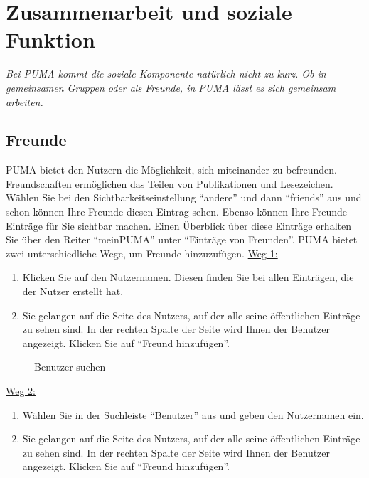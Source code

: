 \chapter{Zusammenarbeit und soziale Funktion}
\textit{Bei PUMA kommt die soziale Komponente natürlich nicht zu kurz. Ob in gemeinsamen Gruppen oder als Freunde, in PUMA lässt es sich gemeinsam arbeiten.}
\section{Freunde}%
PUMA bietet den Nutzern die Möglichkeit, sich miteinander zu befreunden. Freundschaften ermöglichen das Teilen von Publikationen und Lesezeichen. Wählen Sie bei den Sichtbarkeitseinstellung \enquote{andere} und dann \enquote{friends} aus und schon können Ihre Freunde diesen Eintrag sehen. Ebenso können Ihre Freunde Einträge für Sie sichtbar machen. Einen Überblick über diese Einträge erhalten Sie über den Reiter \enquote{meinPUMA} unter \enquote{Einträge von Freunden}.\newline
PUMA bietet zwei unterschiedliche Wege, um Freunde hinzuzufügen.
\newline
\newline
\underline{Weg 1:}
\begin{enumerate} 
    \item Klicken Sie auf den Nutzernamen. Diesen finden Sie bei allen Einträgen, die der Nutzer erstellt hat.
    \item Sie gelangen auf die Seite des Nutzers, auf der alle seine öffentlichen Einträge zu sehen sind. In der rechten Spalte der Seite wird Ihnen der Benutzer angezeigt. Klicken Sie auf \enquote{Freund hinzufügen}.
\end{enumerate}
\begin{figure}[h!]
 \centering
 \caption{Benutzer suchen}
 \label{figure057}
\end{figure}
\underline{Weg 2:}
\begin{enumerate}
    \item Wählen Sie in der Suchleiste \enquote{Benutzer} aus und geben den Nutzernamen ein.
    \item Sie gelangen auf die Seite des Nutzers, auf der alle seine öffentlichen Einträge zu sehen sind. In der rechten Spalte der Seite wird Ihnen der Benutzer angezeigt. Klicken Sie auf \enquote{Freund hinzufügen}.
\end{enumerate}
